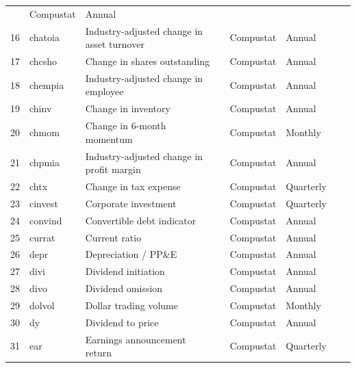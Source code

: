\documentclass[a4paper, table]{article}
\begin{document}
\begin{landscape}
\begin{center}
\begin{longtable}{llllllll}
				\cite{asness_predicting_2000} & Compustat & Annual \\
			16 & chatoia\footnotemark[\value{footnote}] & Industry-adjusted change in asset turnover & 
				\cite{soliman_use_2008} & Compustat & Annual \\
			17 & chcsho & Change in shares outstanding & 
				\cite{pontiff_share_2008} & Compustat & Annual \\
			18 & chempia & Industry-adjusted change in employee & 
				\cite{asness_predicting_2000} & Compustat & Annual \\
			19 & chinv\footnotemark[\value{footnote}] & Change in inventory & 
				\cite{thomas_inventory_2002} & Compustat & Annual \\
			20 & chmom & Change in 6-month momentum & 
				\cite{gettleman_acceleration_2006} & Compustat & Monthly \\
			21 & chpmia\footnotemark[\value{footnote}] & Industry-adjusted change in profit margin & 
				\cite{soliman_use_2008} & Compustat & Annual \\
			22 & chtx & Change in tax expense & 
				\cite{thomas_tax_2011} & Compustat & Quarterly \\
			23 & cinvest & Corporate investment & 
				\cite{titman_capital_2004} & Compustat & Quarterly \\
			24 & convind & Convertible debt indicator & 
				\cite{valta_strategic_2016} & Compustat & Annual \\
			25 & currat & Current ratio & 
				\cite{ou_financial_1989} & Compustat & Annual \\
			26 & depr & Depreciation / PP\&E & 
				\cite{holthausen_prediction_1992} & Compustat & Annual \\
			27 & divi & Dividend initiation & 
				\cite{michaely_price_1995} & Compustat & Annual \\
			28 & divo & Dividend omission & 
				\cite{michaely_price_1995} & Compustat & Annual \\
			29 & dolvol & Dollar trading volume & 
				\cite{chordia_trading_2001} & Compustat & Monthly \\
			30 & dy & Dividend to price & 
				\cite{litzenberger_effects_1982} & Compustat & Annual \\
			31 & ear & Earnings announcement return & 
				\cite{brandt_earnings_2008} & Compustat & Quarterly \\

\end{longtable}
\end{center}
\end{landscape}
\end{document}
